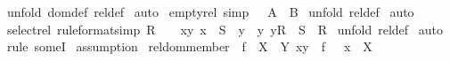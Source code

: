 \begin{isabellebody}
%
\isadelimproof
%
\endisadelimproof
%
\isatagproof
{}\isamarkupfalse%
\ {\isacharparenleft}unfold\ dom{\isacharunderscore}def\ rel{\isacharunderscore}def{\isacharparenright}\isanewline
{}\isamarkupfalse%
\ auto\isanewline
{}\isamarkupfalse%
%
\endisatagproof
{\isafoldproof}%
%
\isadelimproof
\isanewline
%
\endisadelimproof
\isanewline
{}\isamarkupfalse%
\ empty{\isacharunderscore}rel\ {\isacharbrackleft}simp{\isacharbrackright}{\isacharcolon}\ {\isachardoublequoteopen}{\isacharbraceleft}{\isacharbraceright}\ {\isacharcolon}\ {\isacharparenleft}A\ {\isacharless}{\isacharminus}{\isacharminus}{\isachargreater}\ B{\isacharparenright}{\isachardoublequoteclose}\isanewline
%
\isadelimproof
%
\endisadelimproof
%
\isatagproof
{}\isamarkupfalse%
\ {\isacharparenleft}unfold\ rel{\isacharunderscore}def{\isacharparenright}\isanewline
{}\isamarkupfalse%
\ auto\isanewline
{}\isamarkupfalse%
%
\endisatagproof
{\isafoldproof}%
%
\isadelimproof
\isanewline
%
\endisadelimproof
\isanewline
\isanewline
{}\isamarkupfalse%
\ select{\isacharunderscore}rel\ {\isacharbrackleft}rule{\isacharunderscore}format{\isacharcomma}simp{\isacharbrackright}{\isacharcolon}\ {\isachardoublequoteopen}R\ {\isachartilde}{\isacharequal}\ {\isacharbraceleft}{\isacharbraceright}\ {\isacharminus}{\isacharminus}{\isachargreater}\ {\isacharbraceleft}{\isacharparenleft}x{\isacharcomma}y{\isacharparenright}{\isachardot}\ x\ {\isacharcolon}\ S\ {\isacharampersand}\ y\ {\isacharequal}\ {\isacharparenleft}{\isacharat}y{\isachardot}\ y{\isacharcolon}R{\isacharparenright}{\isacharbraceright}\ {\isacharcolon}\ {\isacharparenleft}S\ {\isacharless}{\isacharminus}{\isacharminus}{\isachargreater}\ R{\isacharparenright}{\isachardoublequoteclose}\isanewline
%
\isadelimproof
%
\endisadelimproof
%
\isatagproof
{}\isamarkupfalse%
\ {\isacharparenleft}unfold\ rel{\isacharunderscore}def{\isacharparenright}\isanewline
{}\isamarkupfalse%
\ auto\isanewline
{}\isamarkupfalse%
\ {\isacharparenleft}rule\ someI{\isacharparenright}\isanewline
{}\isamarkupfalse%
\ assumption\isanewline
{}\isamarkupfalse%
%
\endisatagproof
{\isafoldproof}%
%
\isadelimproof
\isanewline
%
\endisadelimproof
\isanewline
\isanewline
{}\isamarkupfalse%
\ rel{\isacharunderscore}dom{\isacharunderscore}member{\isacharcolon}\ {\isachardoublequoteopen}{\isacharbrackleft}{\isacharbar}\ f\ {\isacharcolon}\ {\isacharparenleft}X\ {\isacharless}{\isacharminus}{\isacharminus}{\isachargreater}\ Y{\isacharparenright}{\isacharsemicolon}\ {\isacharparenleft}x{\isacharcomma}y{\isacharparenright}\ {\isacharcolon}\ f\ {\isacharbar}{\isacharbrackright}\ {\isacharequal}{\isacharequal}{\isachargreater}\ x\ {\isacharcolon}\ X{\isachardoublequoteclose}\isanewline

\end{isabellebody}
